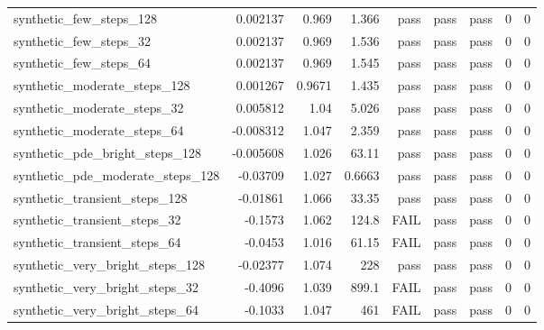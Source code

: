 \documentclass[10pt]{article}
\begin{document}
{\begin{tabular}{lrrrrrrrr}
synthetic\_few\_steps\_128 & 0.002137 & 0.969 & 1.366 & pass & pass & pass & 0 & 0 \\
synthetic\_few\_steps\_32 & 0.002137 & 0.969 & 1.536 & pass & pass & pass & 0 & 0 \\
synthetic\_few\_steps\_64 & 0.002137 & 0.969 & 1.545 & pass & pass & pass & 0 & 0 \\
synthetic\_moderate\_steps\_128 & 0.001267 & 0.9671 & 1.435 & pass & pass & pass & 0 & 0 \\
synthetic\_moderate\_steps\_32 & 0.005812 & 1.04 & 5.026 & pass & pass & pass & 0 & 0 \\
synthetic\_moderate\_steps\_64 & -0.008312 & 1.047 & 2.359 & pass & pass & pass & 0 & 0 \\
synthetic\_pde\_bright\_steps\_128 & -0.005608 & 1.026 & 63.11 & pass & pass & pass & 0 & 0 \\
synthetic\_pde\_moderate\_steps\_128 & -0.03709 & 1.027 & 0.6663 & pass & pass & pass & 0 & 0 \\
synthetic\_transient\_steps\_128 & -0.01861 & 1.066 & 33.35 & pass & pass & pass & 0 & 0 \\
synthetic\_transient\_steps\_32 & -0.1573 & 1.062 & 124.8 & FAIL & pass & pass & 0 & 0 \\
synthetic\_transient\_steps\_64 & -0.0453 & 1.016 & 61.15 & FAIL & pass & pass & 0 & 0 \\
synthetic\_very\_bright\_steps\_128 & -0.02377 & 1.074 & 228 & pass & pass & pass & 0 & 0 \\
synthetic\_very\_bright\_steps\_32 & -0.4096 & 1.039 & 899.1 & FAIL & pass & pass & 0 & 0 \\
synthetic\_very\_bright\_steps\_64 & -0.1033 & 1.047 & 461 & FAIL & pass & pass & 0 & 0 \\
\bottomrule\end{tabular}}
\end{document}
